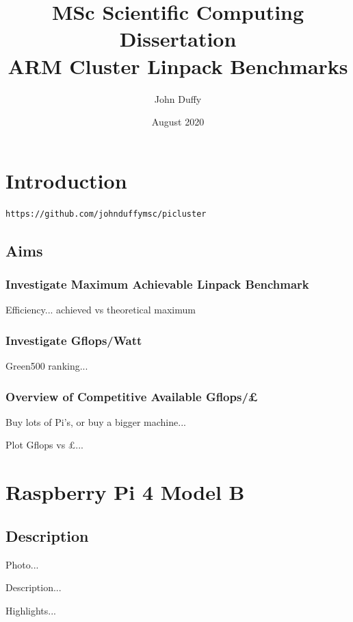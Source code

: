 \documentclass{article}
\title{MSc Scientific Computing Dissertation\\ARM Cluster Linpack Benchmarks}
\author{John Duffy}
\date{August 2020}
\begin{document}
\maketitle



\section{Introduction}

\begin{verbatim}
https://github.com/johnduffymsc/picluster
\end{verbatim}

\subsection{Aims}

\subsubsection{Investigate Maximum Achievable Linpack Benchmark}

Efficiency... achieved vs theoretical maximum

\subsubsection{Investigate Gflops/Watt}

Green500 ranking...

\subsubsection{Overview of Competitive Available Gflops/£}

Buy lots of Pi's, or buy a bigger machine...

Plot Gflops vs £...



\section{Raspberry Pi 4 Model B}

\subsection{Description}

Photo...

Description...

Highlights...
\end{document}
